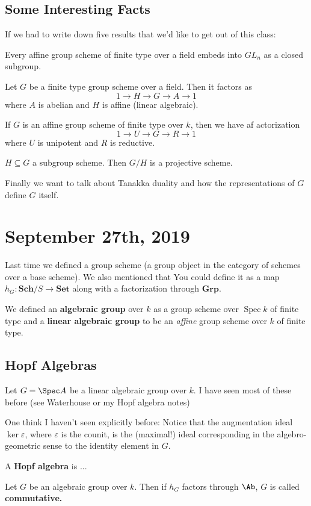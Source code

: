 \documentclass[12pt]{article}
\begin{document}
\subsection{Some Interesting Facts}
If we had to write down five results that we'd like to get out of this class:
\begin{prop}
	Every affine group scheme of finite type over a field embeds into $GL_n$ as a closed subgroup.
\end{prop}
\begin{thm}
	Let $G$ be a finite type group scheme over a field. Then it factors as 
	\[1\to H\to G\to A\to 1\]
	where $A$ is abelian and $H$ is affine (linear algebraic).
\end{thm}
\begin{prop}
	If $G$ is an affine group scheme of finite type over $k$, then we have af actorization
	\[1\to U\to G\to R\to 1\]
	where $U$ is unipotent and $R$ is reductive.
\end{prop}
\begin{prop}
	$H\subseteq G$  a subgroup scheme. Then $G/H$ is a projective scheme.
\end{prop}
Finally we want to talk about Tanakka duality and how the representations of $G$ define $G$ itself.

\section{September 27th, 2019}
Last time we defined a group scheme (a group object in the category of schemes over a base scheme). We also mentioned that 
You could define it as a map $h_G:\mathbf{Sch}/S\to \mathbf{Set}$ along with a factorization through $\mathbf{Grp}$.

We defined an \textbf{algebraic group} over $k$ as a group scheme over $\operatorname{Spec} k$ of finite type and a \textbf{linear algebraic group}
to be an \textit{affine} group scheme over $k$ of finite type.

\subsection{Hopf Algebras}
Let $G=\Spec A$ be a linear algebraic group over $k$. I have seen most of these before (see Waterhouse or my Hopf algebra notes)
\begin{rmk}
	One think I haven't seen explicitly before: Notice that the augmentation ideal $\ker \varepsilon$, where $\varepsilon$ is the counit,
	is the (maximal!) ideal corresponding in the algebro-geometric sense to the identity element in $G$.
\end{rmk}
\begin{defn}
	A \textbf{Hopf algebra} is ...
\end{defn}
\begin{defn}
	Let $G$ be an algebraic group over $k$. Then if $h_G$ factors through $\Ab$, $G$ is called \textbf{commutative.}
\end{defn}
\end{document}

